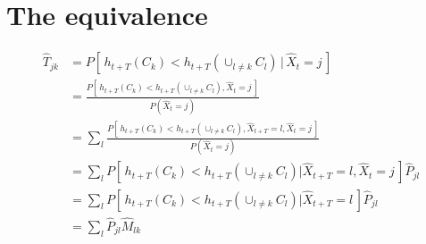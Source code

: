 \documentclass[aps, pre, preprint,unsortedaddress,a4paper,onecolumn]{revtex4}
\begin{document}
\section{The equivalence}
\begin{align*}
  \hat T_{jk} &=
  P [\,h_{t+T}(C_k) < h_{t+T}(\cup_{l\neq k} C_l) \,\vert\, \hat X_t = j\,]\\
  &=
  \frac{P [\,h_{t+T}(C_k) < h_{t+T}(\cup_{l\neq k} C_l), \hat X_t = j\,] }{P(\hat X_t = j)}\\
  & =
  \sum_l \frac{P [\,h_{t+T}(C_k) < h_{t+T}(\cup_{l\neq k} C_l), \hat X_{t+T} = l, \hat X_t = j\,] }{P(\hat X_t = j)}\\
  & =
  \sum_l P [\,h_{t+T}(C_k) < h_{t+T}(\cup_{l\neq k} C_l)\vert \hat X_{t+T} = l, \hat X_t = j\,] \hat P_{jl}\\  
  & =
  \sum_l P [\,h_{t+T}(C_k) < h_{t+T}(\cup_{l\neq k} C_l)\vert \hat X_{t+T} = l\,] \hat P_{jl}\\
  &= 
  \sum_l  \hat P_{jl}\hat M_{lk}
\end{align*}
  


{}

\end{document}
